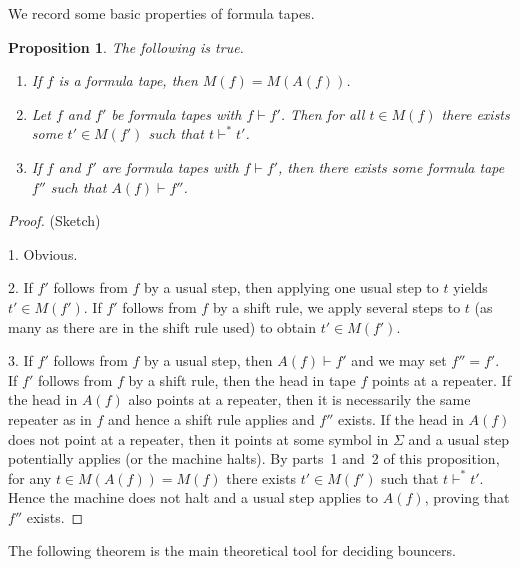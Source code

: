\documentclass{article}
\newtheorem{proposition}{Proposition}
\begin{document}

We record some basic properties of formula tapes.

\begin{proposition}\label{ftapeProps}
	The following is true.
	\begin{enumerate}
		\item If \( f \) is a formula tape, then \( M(f) = M(A(f)) \).
		\item Let \( f \) and \( f' \) be formula tapes with \( f \vdash f' \).
			Then for all \( t \in M(f) \) there exists some \( t' \in M(f') \) such that \( t \vdash^* t' \).
		\item If \( f \) and \( f' \) are formula tapes with \( f \vdash f' \), then there exists some formula tape \( f'' \)
			such that \( A(f) \vdash f'' \).
	\end{enumerate}
\end{proposition}
\begin{proof} (Sketch)

	1. Obvious.

	2. If \( f' \) follows from \( f \) by a usual step, then applying one usual step to \( t \) yields \( t' \in M(f') \).
	If \( f' \) follows from \( f \) by a shift rule, we apply several steps to \( t \) (as many as there are in the shift rule used)
	to obtain \( t' \in M(f') \).

	3. If \( f' \) follows from \( f \) by a usual step, then \( A(f) \vdash f' \) and we may set \( f'' = f' \).
	If \( f' \) follows from \( f \) by a shift rule, then the head in tape \( f \) points at a repeater.
	If the head in \( A(f) \) also points at a repeater, then it is necessarily the same repeater as in \( f \)
	and hence a shift rule applies and \( f'' \) exists. If the head in \( A(f) \) does not point at a repeater,
	then it points at some symbol in \( \Sigma \) and a usual step potentially applies (or the machine halts).
	By parts~1 and~2 of this proposition, for any \( t \in M(A(f)) = M(f) \) there exists \( t' \in M(f') \) such that \( t \vdash^* t' \).
	Hence the machine does not halt and a usual step applies to \( A(f) \), proving that \( f'' \) exists.
\end{proof}

The following theorem is the main theoretical tool for deciding bouncers.
\end{document}
